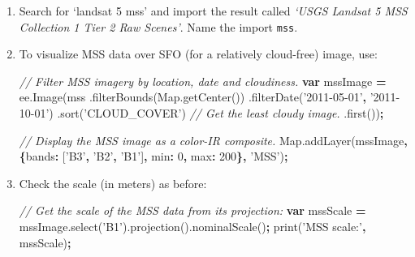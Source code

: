 \documentclass[
]{article}
\newenvironment{Shaded}{\begin{snugshade}}{\end{snugshade}}
\newcommand{\AttributeTok}[1]{\textcolor[rgb]{0.77,0.63,0.00}{#1}}
\newcommand{\CommentTok}[1]{\textcolor[rgb]{0.56,0.35,0.01}{\textit{#1}}}
\newcommand{\DataTypeTok}[1]{\textcolor[rgb]{0.13,0.29,0.53}{#1}}
\newcommand{\DecValTok}[1]{\textcolor[rgb]{0.00,0.00,0.81}{#1}}
\newcommand{\KeywordTok}[1]{\textcolor[rgb]{0.13,0.29,0.53}{\textbf{#1}}}
\newcommand{\NormalTok}[1]{#1}
\newcommand{\OperatorTok}[1]{\textcolor[rgb]{0.81,0.36,0.00}{\textbf{#1}}}
\newcommand{\StringTok}[1]{\textcolor[rgb]{0.31,0.60,0.02}{#1}}
\newcommand{\VariableTok}[1]{\textcolor[rgb]{0.00,0.00,0.00}{#1}}
\begin{document}
\begin{enumerate}
\def\labelenumi{\arabic{enumi}.}
\item
  Search for `landsat 5 mss' and import the result called \emph{`USGS Landsat 5 MSS Collection 1 Tier 2 Raw Scenes'}. Name the import \texttt{mss}.
\item
  To visualize MSS data over SFO (for a relatively cloud-free) image, use:

\begin{Shaded}
\begin{Highlighting}[]
\CommentTok{// Filter MSS imagery by location, date and cloudiness.   }
\KeywordTok{var}\NormalTok{ mssImage }\OperatorTok{=} \VariableTok{ee}\NormalTok{.}\AttributeTok{Image}\NormalTok{(mss     }
\NormalTok{                        .}\AttributeTok{filterBounds}\NormalTok{(}\VariableTok{Map}\NormalTok{.}\AttributeTok{getCenter}\NormalTok{())     }
\NormalTok{                        .}\AttributeTok{filterDate}\NormalTok{(}\StringTok{'2011-05-01'}\OperatorTok{,}  \StringTok{'2011-10-01'}\NormalTok{)     }
\NormalTok{                        .}\AttributeTok{sort}\NormalTok{(}\StringTok{'CLOUD_COVER'}\NormalTok{)     }
                        \CommentTok{//  Get the least cloudy image.     }
\NormalTok{                        .}\AttributeTok{first}\NormalTok{())}\OperatorTok{;}  

\CommentTok{// Display the MSS image as a color-IR composite.}
\VariableTok{Map}\NormalTok{.}\AttributeTok{addLayer}\NormalTok{(mssImage}\OperatorTok{,} \OperatorTok{\{}\DataTypeTok{bands}\OperatorTok{:}\NormalTok{ [}\StringTok{'B3'}\OperatorTok{,} \StringTok{'B2'}\OperatorTok{,} \StringTok{'B1'}\NormalTok{]}\OperatorTok{,} \DataTypeTok{min}\OperatorTok{:} \DecValTok{0}\OperatorTok{,} \DataTypeTok{max}\OperatorTok{:} \DecValTok{200}\OperatorTok{\},} \StringTok{'MSS'}\NormalTok{)}\OperatorTok{;}
\end{Highlighting}
\end{Shaded}
\item
  Check the scale (in meters) as before:

\begin{Shaded}
\begin{Highlighting}[]
\CommentTok{// Get the scale of the MSS data from its projection:}
\KeywordTok{var}\NormalTok{ mssScale }\OperatorTok{=} \VariableTok{mssImage}\NormalTok{.}\AttributeTok{select}\NormalTok{(}\StringTok{'B1'}\NormalTok{).}\AttributeTok{projection}\NormalTok{().}\AttributeTok{nominalScale}\NormalTok{()}\OperatorTok{;}
\AttributeTok{print}\NormalTok{(}\StringTok{'MSS scale:'}\OperatorTok{,}\NormalTok{ mssScale)}\OperatorTok{;}
\end{Highlighting}
\end{Shaded}
\end{enumerate}
\end{document}
